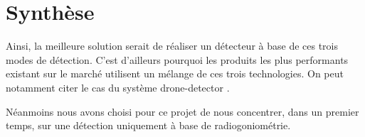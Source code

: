 \section{Synthèse}

Ainsi, la meilleure solution serait de réaliser un détecteur à base de ces trois modes de détection. C'est d'ailleurs pourquoi les produits les plus performants existant sur le marché utilisent un mélange de ces trois technologies. On peut notamment citer le cas du système drone-detector \cite{dronedetector}.

Néanmoins nous avons choisi pour ce projet de nous concentrer, dans un premier temps, sur une détection uniquement à base de radiogoniométrie.




